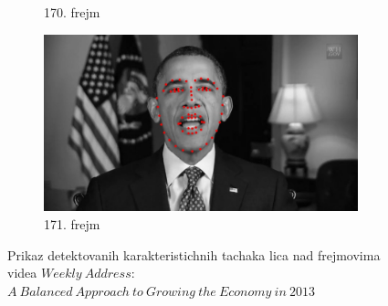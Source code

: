 \documentclass[a4paper, openany, oneside, 11pt]{book}
\begin{document}
\begin{figure}[!h]
\begin{subfigure}{0.475\textwidth}
            \caption{170. frejm}
            \label{fig:2_5c}
            \vspace{0pt}
        \end{subfigure}%
        \begin{subfigure}{0.475\textwidth}
            \centering
            \includegraphics[scale=0.21]{res/171lm.jpg}
            \caption{171. frejm}
            \label{fig:2_5d}
            \vspace{0pt}
        \end{subfigure}
        \caption{Prikaz detektovanih karakteristichnih tachaka lica nad frejmovima videa $Weekly\ Address$: $A\ Balanced\ Approach\ to\ Growing\ the\ Economy\ in\ 2013$}
        \label{fig:2_5}
\end{figure}
\end{document}
